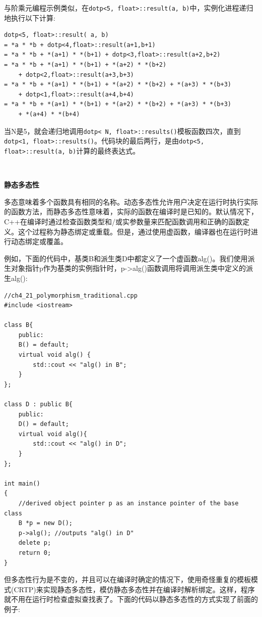 与阶乘元编程示例类似，在\texttt{dotp<5, float>::result(a, b)}中，实例化进程递归地执行以下计算: \par

\begin{lstlisting}[caption={}]
dotp<5, float>::result( a, b)
= *a * *b + dotp<4,float>::result(a+1,b+1)
= *a * *b + *(a+1) * *(b+1) + dotp<3,float>::result(a+2,b+2)
= *a * *b + *(a+1) * *(b+1) + *(a+2) * *(b+2)
	+ dotp<2,float>::result(a+3,b+3)
= *a * *b + *(a+1) * *(b+1) + *(a+2) * *(b+2) + *(a+3) * *(b+3)
	+ dotp<1,float>::result(a+4,b+4)
= *a * *b + *(a+1) * *(b+1) + *(a+2) * *(b+2) + *(a+3) * *(b+3)
	+ *(a+4) * *(b+4)
\end{lstlisting}

当N是5，就会递归地调用\texttt{dotp< N, float>::results()}模板函数四次，直到\texttt{dotp<1, float>::results()}。代码块的最后两行，是由\texttt{dotp<5, float>::result(a, b)}计算的最终表达式。 \par

\noindent\textbf{}\ \par
\textbf{静态多态性} \ \par
多态意味着多个函数具有相同的名称。动态多态性允许用户决定在运行时执行实际的函数方法，而静态多态性意味着，实际的函数在编译时是已知的。默认情况下，C++在编译时通过检查函数类型和/或实参数量来匹配函数调用和正确的函数定义。这个过程称为静态绑定或重载。但是，通过使用虚函数，编译器也在运行时进行动态绑定或覆盖。 \par
例如，下面的代码中，基类B和派生类D中都定义了一个虚函数alg()。我们使用派生对象指针p作为基类的实例指针时，p->alg()函数调用将调用派生类中定义的派生alg(): \par

\begin{lstlisting}[caption={}]
//ch4_21_polymorphism_traditional.cpp
#include <iostream>

class B{
	public:
	B() = default;
	virtual void alg() {
		std::cout << "alg() in B";
	}
};

class D : public B{
	public:
	D() = default;
	virtual void alg(){
		std::cout << "alg() in D";
	}
};

int main()
{
	//derived object pointer p as an instance pointer of the base class
	B *p = new D();
	p->alg(); //outputs "alg() in D"
	delete p;
	return 0;
}
\end{lstlisting}

但多态性行为是不变的，并且可以在编译时确定的情况下，使用奇怪重复的模板模式(CRTP)来实现静态多态性，模仿静态多态性并在编译时解析绑定。这样，程序就不用在运行时检查虚拟查找表了。下面的代码以静态多态性的方式实现了前面的例子: \par


